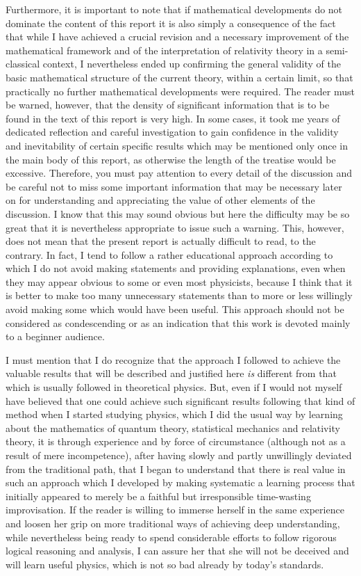 \documentclass[notitlepage,12pt]{report}
\begin{document}
Furthermore, it is important to note that if mathematical developments do not dominate the content of this report it is also simply a consequence of the fact that while I have achieved a crucial revision and a necessary improvement of the mathematical framework and of the interpretation of relativity theory in a semi-classical context, I nevertheless ended up confirming the general validity of the basic mathematical structure of the current theory, within a certain limit, so that practically no further mathematical developments were required. The reader must be warned, however, that the density of significant information that is to be found in the text of this report is very high. In some cases, it took me years of dedicated reflection and careful investigation to gain confidence in the validity and inevitability of certain specific results which may be mentioned only once in the main body of this report, as otherwise the length of the treatise would be excessive. Therefore, you must pay attention to every detail of the discussion and be careful not to miss some important information that may be necessary later on for understanding and appreciating the value of other elements of the discussion. I know that this may sound obvious but here the difficulty may be so great that it is nevertheless appropriate to issue such a warning. This, however, does not mean that the present report is actually difficult to read, to the contrary. In fact, I tend to follow a rather educational approach according to which I do not avoid making statements and providing explanations, even when they may appear obvious to some or even most physicists, because I think that it is better to make too many unnecessary statements than to more or less willingly avoid making some which would have been useful. This approach should not be considered as condescending or as an indication that this work is devoted mainly to a beginner audience.

I must mention that I do recognize that the approach I followed to achieve the valuable results that will be described and justified here \textit{is} different from that which is usually followed in theoretical physics. But, even if I would not myself have believed that one could achieve such significant results following that kind of method when I started studying physics, which I did the usual way by learning about the mathematics of quantum theory, statistical mechanics and relativity theory, it is through experience and by force of circumstance (although not as a result of mere incompetence), after having slowly and partly unwillingly deviated from the traditional path, that I began to understand that there is real value in such an approach which I developed by making systematic a learning process that initially appeared to merely be a faithful but irresponsible time-wasting improvisation. If the reader is willing to immerse herself in the same experience and loosen her grip on more traditional ways of achieving deep understanding, while nevertheless being ready to spend considerable efforts to follow rigorous logical reasoning and analysis, I can assure her that she will not be deceived and will learn useful physics, which is not so bad already by today's standards.
\end{document}
